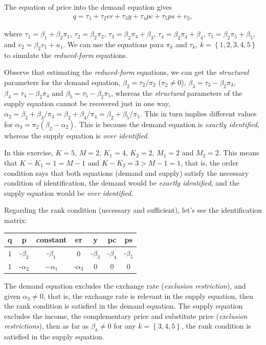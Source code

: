 \begin{enumerate}[leftmargin=*]
The equation of price into the demand equation gives
\begin{align*}
	q=\tau_1+\tau_2 er + \tau_3 y + \tau_4 pc + \tau_5 ps + v_2,
\end{align*}

where $\tau_1=\beta_1+\beta_2\pi_1$, $\tau_2=\beta_2\pi_2$, $\tau_3=\beta_2\pi_3+\beta_3$, $\tau_4=\beta_2\pi_4+\beta_4$, $\tau_5=\beta_2\pi_5+\beta_5$, and $v_2=\beta_2v_1+u_1$. We can use the equations para $\pi_k$ and $\tau_k$, $k=\left\{1,2,3,4,5\right\}$ to simulate the \textit{reduced-form} equations.

Observe that estimating the \textit{reduced-form} equations, we can get the \textit{structural} parameters for the demand equation, $\beta_2=\tau_2/\pi_2$ ($\pi_2\neq 0$), $\beta_3=\tau_3-\beta_2\pi_3$, $\beta_4=\tau_4-\beta_2\pi_4$ and $\beta_5=\tau_5-\beta_2\pi_5$, whereas the \textit{structural} parameters of the supply equation cannot be recovered just in one way, $\alpha_2=\beta_2+\beta_3/\pi_3=\beta_2+\beta_4/\pi_4=\beta_2+\beta_5/\pi_5$. This in turn implies different values for  $\alpha_3=\pi_2(\beta_2-\alpha_2)$. This is because the demand equation is \textit{exactly identified}, whereas the supply equation is \textit{over identified}. 

In this exercise, $K=5$, $M=2$, $K_1=4$, $K_2=2$, $M_1=2$ and $M_2=2$. This means that $K-K_1=1=M-1$ and $K-K_2=3>M-1=1$, that is, the order condition says that both equations (demand and supply) satisfy the necessary condition of identification, the demand would be \textit{exactly identified}, and the supply equation would be \textit{over identified}.

Regarding the rank condition (necessary and sufficient), let's see the identification matrix:
\begin{table}[!h]
	\label{tab:71}%
	\begin{tabular}{ccccccc}
		q    & p & constant & er & y & pc & ps \\
		\hline
		1 & -$\beta_2$ & -$\beta_1$ & 0 & -$\beta_3$ & -$\beta_4$ & -$\beta_5$\\
		1 & -$\alpha_2$ & $-\alpha_1$ & -$\alpha_3$ & 0 & 0 & 0 \\
	\end{tabular}
\end{table}

The demand equation excludes the exchange rate (\textit{exclusion restriction}), and given $\alpha_3\neq 0$, that is, the exchange rate is relevant in the supply equation, then the rank condition is satisfied in the demand equation. The supply equation excludes the income, the complementary price and substitute price (\textit{exclusion restrictions}), then as far as $\beta_k\neq 0$ for any $k=\left\{3,4,5\right\}$, the rank condition is satisfied in the supply equation.


\end{enumerate}
